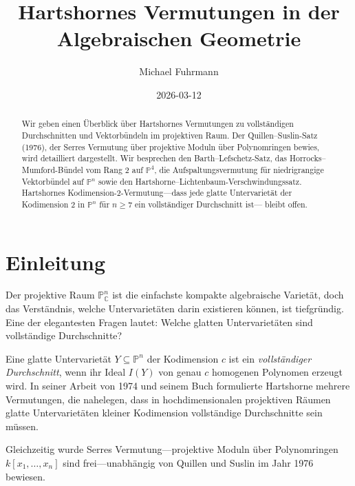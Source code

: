 \documentclass[12pt,a4paper]{amsart}
\theoremstyle{definition}
\theoremstyle{remark}
\newcommand{\PP}{\mathbb{P}}
\newcommand{\CC}{\mathbb{C}}
\begin{document}
\begin{abstract}
Wir geben einen Überblick über Hartshornes Vermutungen zu vollständigen
Durchschnitten und Vektorbündeln im projektiven Raum.
Der Quillen--Suslin-Satz (1976), der Serres Vermutung über projektive
Moduln über Polynomringen bewies, wird detailliert dargestellt.
Wir besprechen den Barth--Lefschetz-Satz, das Horrocks--Mumford-Bündel
vom Rang 2 auf $\PP^4$, die Aufspaltungsvermutung für niedrigrangige
Vektorbündel auf $\PP^n$ sowie den
Hartshorne--Lichtenbaum-Verschwindungssatz.
Hartshornes Kodimension-2-Vermutung---dass jede glatte Untervarietät der
Kodimension 2 in $\PP^n$ für $n \ge 7$ ein vollständiger Durchschnitt ist---
bleibt offen.
\end{abstract}

\title{Hartshornes Vermutungen in der Algebraischen Geometrie}

\author{Michael Fuhrmann}
\address{Specialist Mathematics Project, Build 169}
\date{2026-03-12}

\maketitle
\tableofcontents

\section{Einleitung}

Der projektive Raum $\PP^n_\CC$ ist die einfachste kompakte algebraische
Varietät, doch das Verständnis, welche Untervarietäten darin existieren können,
ist tiefgründig.  Eine der elegantesten Fragen lautet: Welche glatten
Untervarietäten sind vollständige Durchschnitte?

Eine glatte Untervarietät $Y \subseteq \PP^n$ der Kodimension $c$ ist ein
\emph{vollständiger Durchschnitt}, wenn ihr Ideal $I(Y)$ von genau $c$
homogenen Polynomen erzeugt wird.  In seiner Arbeit von 1974 \cite{Hartshorne1974}
und seinem Buch \cite{Hartshorne1977} formulierte Hartshorne mehrere Vermutungen,
die nahelegen, dass in hochdimensionalen projektiven Räumen glatte
Untervarietäten kleiner Kodimension vollständige Durchschnitte sein müssen.

Gleichzeitig wurde Serres Vermutung---projektive Moduln über Polynomringen
$k[x_1,\ldots,x_n]$ sind frei---unabhängig von Quillen \cite{Quillen1976}
und Suslin \cite{Suslin1976} im Jahr 1976 bewiesen.
\end{document}
